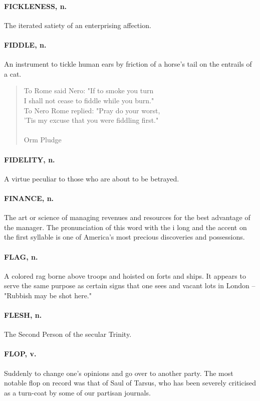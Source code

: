 \documentclass[11pt]{article}
\begin{document}
\paragraph{FICKLENESS, n.}  The iterated satiety of an enterprising affection.

\paragraph{FIDDLE, n.}  An instrument to tickle human ears by friction of a
horse's tail on the entrails of a cat.

\begin{quote}   To Rome said Nero:  "If to smoke you turn \\
  I shall not cease to fiddle while you burn." \\
  To Nero Rome replied:  "Pray do your worst, \\
  'Tis my excuse that you were fiddling first." \\
 \\
Orm Pludge \end{quote}


\paragraph{FIDELITY, n.}  A virtue peculiar to those who are about to be betrayed.

\paragraph{FINANCE, n.}  The art or science of managing revenues and resources for
the best advantage of the manager.  The pronunciation of this word
with the i long and the accent on the first syllable is one of
America's most precious discoveries and possessions.

\paragraph{FLAG, n.}  A colored rag borne above troops and hoisted on forts and
ships.  It appears to serve the same purpose as certain signs that one
sees and vacant lots in London -- "Rubbish may be shot here."

\paragraph{FLESH, n.}  The Second Person of the secular Trinity.

\paragraph{FLOP, v.}  Suddenly to change one's opinions and go over to another
party.  The most notable flop on record was that of Saul of Tarsus,
who has been severely criticised as a turn-coat by some of our
partisan journals.
\end{document}
